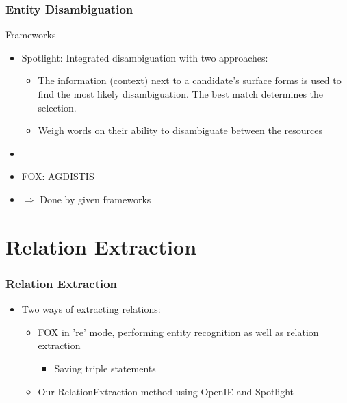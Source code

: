 \documentclass{beamer}
\begin{document}
\begin{frame}
\frametitle{Entity Disambiguation}
\begin{block}{Frameworks}
\begin{itemize}
	\item Spotlight: Integrated disambiguation with two approaches: 
	\begin{itemize}
		\item The information (context) next to a candidate's surface forms is used to find the most likely disambiguation. The best match determines the selection.
		\item Weigh words on their ability to disambiguate between the resources
	\end{itemize}
	\item[] \cite{p2}
	\item FOX: AGDISTIS
\end{itemize}
\end{block}
\begin{itemize}
	\item[] $\Rightarrow$ Done by given frameworks
\end{itemize}

\end{frame}


\section{Relation Extraction}

\begin{frame}
\frametitle{Relation Extraction}
\begin{itemize}
	\item Two ways of extracting relations:
	\begin{itemize}
		\item FOX in 're' mode, performing entity recognition as well as relation extraction
		\begin{itemize}
			\item Saving triple statements
		\end{itemize}
		\item Our RelationExtraction method using OpenIE and Spotlight 
	\end{itemize}
\end{itemize}
\end{frame}
\end{document}
